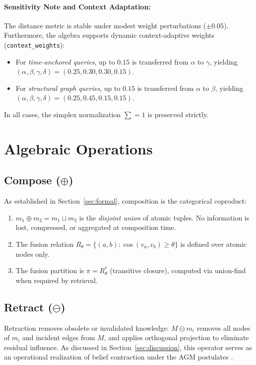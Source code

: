 \documentclass[11pt,a4paper]{article}
\theoremstyle{definition}
\begin{document}
\paragraph{Sensitivity Note and Context Adaptation:}
The distance metric is stable under modest weight perturbations ($\pm 0.05$). Furthermore, the algebra supports dynamic context-adaptive weights (\texttt{context\_weights}):
\begin{itemize}
    \item For \emph{time-anchored queries}, up to $0.15$ is transferred from $\alpha$ to $\gamma$, yielding $(\alpha, \beta, \gamma, \delta) = (0.25, 0.30, 0.30, 0.15)$.
    \item For \emph{structural graph queries}, up to $0.15$ is transferred from $\alpha$ to $\beta$, yielding $(\alpha, \beta, \gamma, \delta) = (0.25, 0.45, 0.15, 0.15)$.
\end{itemize}
In all cases, the simplex normalization $\sum = 1$ is preserved strictly.

\section{Algebraic Operations}\label{sec:operations}

\subsection{Compose ($\oplus$)}

As established in Section~\ref{sec:formal}, composition is the categorical coproduct:
\begin{enumerate}
    \item $m_1 \oplus m_2 = m_1 \sqcup m_2$ is the \emph{disjoint union} of atomic tuples. No information is lost, compressed, or aggregated at composition time.
    \item The fusion relation $R_\theta = \{(a,b) : \cos(v_a, v_b) \geq \theta\}$ is defined over atomic nodes only.
    \item The fusion partition is $\pi = R_\theta^*$ (transitive closure), computed via union-find when required by retrieval.
\end{enumerate}

\subsection{Retract ($\ominus$)}

Retraction removes obsolete or invalidated knowledge: $M \ominus m_i$ removes all nodes of $m_i$ and incident edges from $M$, and applies orthogonal projection to eliminate residual influence. As discussed in Section~\ref{sec:discussion}, this operator serves as an operational realization of belief contraction under the AGM postulates \cite{alchourron1985logic}.
\end{document}
